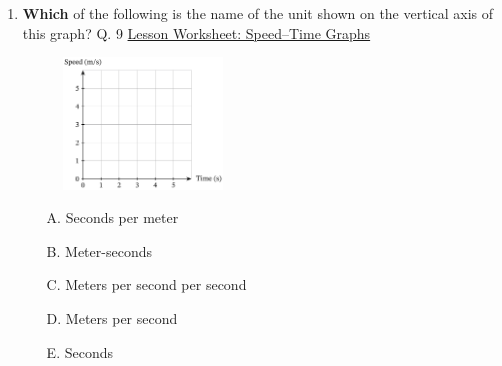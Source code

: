 \documentclass[A4,12pt]{article}
\begin{document}
\begin{enumerate}[label=\bfseries (\arabic*)]
\item \textbf{Which} of the following is the name of the unit shown on the vertical axis of this graph?  \cite{Nagwa} Q. 9 \href{https://www.nagwa.com/en/worksheets/257191315239/}{Lesson Worksheet: Speed–Time Graphs}
%
\begin{figure}[H]
    \centering
    \includegraphics[width=0.4\textwidth]{Nagwa_Q9_Speedt.png}
\end{figure}
%
\begin{itemize}
    \item[A.] Seconds per meter
    \item[B.] Meter-seconds
    \item[C.] Meters per second per second
    \item[D.] Meters per second
    \item[E.] Seconds
\end{itemize}













\end{enumerate}
\end{document}
